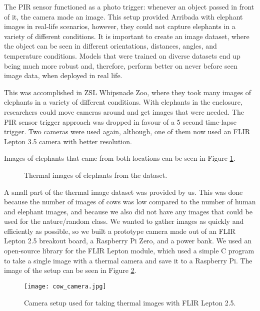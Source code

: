 The PIR sensor functioned as a photo trigger: whenever an object passed in front of it, the camera made an image.
This setup provided Arribada with elephant images in real-life scenarios, however, they could not capture elephants in a variety of different conditions. 
It is important to create an image dataset, where the object can be seen in different orientations, distances, angles, and temperature conditions.
Models that were trained on diverse datasets end up being much more robust and, therefore, perform better on never before seen image data, when deployed in real life.

This was accomplished in ZSL Whipsnade Zoo, where they took many images of elephants in a variety of different conditions\cite{dataset_collection}.
With elephants in the enclosure, researchers could move cameras around and get images that were needed.
The PIR sensor trigger approach was dropped in favour of a 5 second time-lapse trigger.
Two cameras were used again, although, one of them now used an FLIR Lepton 3.5 camera with better resolution.

Images of elephants that came from both locations can be seen in Figure \ref{four_elephants}.

\begin{figure}[ht]
    \centering
    \caption{Thermal images of elephants from the dataset.}
    \label{four_elephants}
\end{figure}


A small part of the thermal image dataset was provided by us. This was done because the number of images of cows was low compared to the number of human and elephant images, and because we also did not have any images that could be used for the nature/random class.
We wanted to gather images as quickly and efficiently as possible, so we built a prototype camera made out of an FLIR Lepton 2.5 breakout board, a Raspberry Pi Zero, and a power bank.
We used an open-source library \cite{flir_github} for the FLIR Lepton module, which used a simple C program to take a single image with a thermal camera and save it to a Raspberry Pi.
The image of the setup can be seen in Figure \ref{cow_camera}.

\begin{figure}[ht]
    \centering
    \texttt{[image: cow\_camera.jpg]} 
    \caption{Camera setup used for taking thermal images with FLIR Lepton 2.5.}
    \label{cow_camera}
\end{figure}

